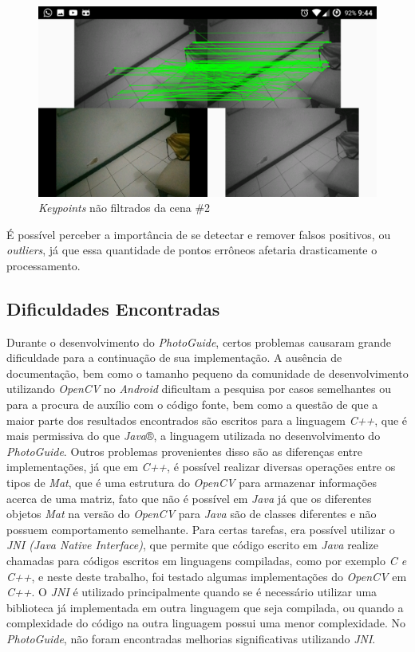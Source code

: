 \begin{figure}[H]
	\centering
		\includegraphics[width= \textwidth]{Imagens/figura3-11.png}
	\caption{\textit{Keypoints} não filtrados da cena \#2}
	\label{fig3:11}
\end{figure}


É possível perceber a importância de se detectar e remover falsos positivos, ou \textit{outliers}, já que essa quantidade de pontos errôneos afetaria drasticamente o processamento.

\subsection{Dificuldades Encontradas}

Durante o desenvolvimento do \textit{PhotoGuide}, certos problemas causaram grande dificuldade para a continuação de sua implementação. A ausência de documentação, bem como o tamanho pequeno da comunidade de desenvolvimento utilizando \textit{OpenCV} no \textit{Android} dificultam a pesquisa por casos semelhantes ou para a procura de auxílio com o código fonte, bem como a questão de que a maior parte dos resultados encontrados são escritos para a linguagem \textit{C++}, que é mais permissiva do que \textit{Java}®, a linguagem utilizada no desenvolvimento do \textit{PhotoGuide}. Outros problemas provenientes disso são as diferenças entre implementações, já que em \textit{C++}, é possível realizar diversas operações entre os tipos de \textit{Mat},  que é uma estrutura do \textit{OpenCV} para armazenar informações acerca de uma matriz, fato que não é possível em \textit{Java} já que os diferentes objetos \textit{Mat} na versão do \textit{OpenCV} para \textit{Java} são de classes diferentes e não possuem comportamento semelhante. Para certas tarefas, era possível utilizar o \textit{JNI (Java Native Interface)}\cite{JNI}, que permite que código escrito em \textit{Java }realize chamadas para códigos escritos em linguagens compiladas, como por exemplo \textit{C e C++}, e neste deste trabalho, foi testado algumas implementações do \textit{OpenCV} em \textit{C++}. O \textit{JNI} é utilizado principalmente quando se é necessário utilizar uma biblioteca já implementada em outra linguagem que seja compilada, ou quando a complexidade do código na outra linguagem possui uma menor complexidade. No \textit{PhotoGuide}, não foram encontradas melhorias significativas utilizando \textit{JNI}. 

